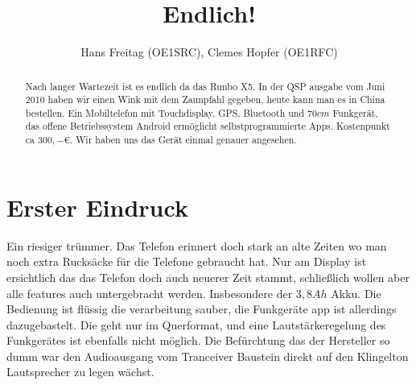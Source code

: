 \documentclass{article}
\begin{document}
\title{Endlich!}
\author{Hans Freitag (OE1SRC), Clemes Hopfer (OE1RFC)}
\maketitle
\begin{abstract}
Nach langer Wartezeit ist es endlich da das Runbo X5. In der QSP ausgabe vom Juni 2010 haben wir einen Wink mit dem Zaunpfahl gegeben, heute 
kann man es in China bestellen. Ein Mobiltelefon mit Touchdisplay, GPS, Bluetooth und $70cm$ Funkgerät, das offene Betriebssystem Android 
ermöglicht selbstprogrammierte Apps. Kostenpunkt ca $300,- \euro$. Wir haben uns das Gerät einmal genauer angesehen. 
\end{abstract}

\section{Erster Eindruck}

Ein riesiger trümmer. Das Telefon erinnert doch stark an alte Zeiten wo man noch extra Rucksäcke für die Telefone gebraucht hat. Nur am Display 
ist ersichtlich das das Telefon doch auch neuerer Zeit stammt, schließlich wollen aber alle features auch untergebracht werden. Insbesondere 
der $3,8 Ah$ Akku. Die Bedienung ist flüssig die verarbeitung sauber, die Funkgeräte app ist allerdings dazugebastelt. Die geht nur im Querformat, 
und eine Lautstärkeregelung des Funkgerätes ist ebenfalls nicht möglich. Die Befürchtung das der Hersteller so dumm war den Audioausgang vom 
Tranceiver Baustein direkt auf den Klingelton Lautsprecher zu legen wächst. \\
\end{document}
